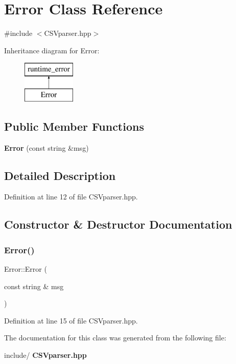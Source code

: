 \section{Error Class Reference}
\label{class_error}


{\ttfamily \#include $<$C\+S\+Vparser.\+hpp$>$}

Inheritance diagram for Error\+:\begin{figure}[H]
\begin{center}
\leavevmode
\includegraphics[height=2.000000cm]{class_error}
\end{center}
\end{figure}
\subsection*{Public Member Functions}
\begin{DoxyCompactItemize}
\item 
\textbf{ Error} (const string \&msg)
\end{DoxyCompactItemize}


\subsection{Detailed Description}


Definition at line 12 of file C\+S\+Vparser.\+hpp.



\subsection{Constructor \& Destructor Documentation}
\mbox{\label{class_error_af330fc77babbadebc9a12b3aabfe146f}} 
\subsubsection{Error()}
{\footnotesize\ttfamily Error\+::\+Error (\begin{DoxyParamCaption}\item[{const string \&}]{msg }\end{DoxyParamCaption})\hspace{0.3cm}{\ttfamily [inline]}}



Definition at line 15 of file C\+S\+Vparser.\+hpp.



The documentation for this class was generated from the following file\+:\begin{DoxyCompactItemize}
\item 
include/\textbf{ C\+S\+Vparser.\+hpp}\end{DoxyCompactItemize}
